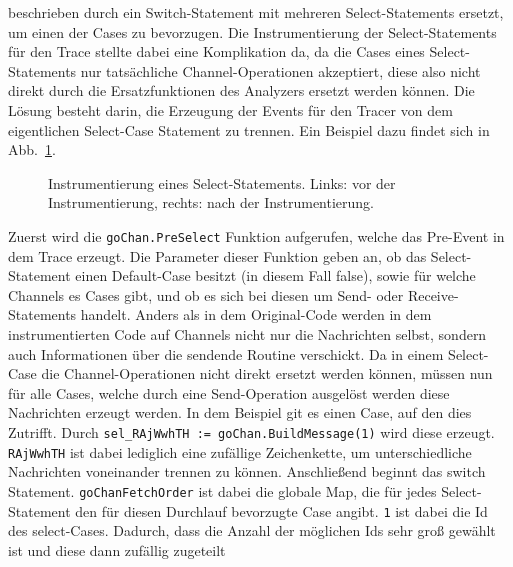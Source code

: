 beschrieben durch ein Switch-Statement mit mehreren Select-Statements 
ersetzt, um einen der Cases zu bevorzugen. 
Die Instrumentierung der Select-Statements für den Trace stellte dabei 
eine Komplikation da, da die Cases eines Select-Statements nur tatsächliche
Channel-Operationen akzeptiert, diese also nicht direkt durch die Ersatzfunktionen 
des Analyzers ersetzt werden können. Die Lösung besteht darin, die 
Erzeugung der Events für den Tracer von dem eigentlichen Select-Case Statement 
zu trennen. Ein Beispiel dazu findet sich in 
Abb.~\ref{Chap:Instrumenter-Sec:Instrumenter-Fig:SelectFull}.
\begin{figure}[h!]
  \begin{minipage}[t]{0.3\textwidth}
    
  \end{minipage}
  \begin{minipage}[t]{0.65\textwidth}
    
  \end{minipage}
  \caption{Instrumentierung eines Select-Statements. Links: vor der 
    Instrumentierung, rechts: nach der Instrumentierung.}
  \label{Chap:Instrumenter-Sec:Instrumenter-Fig:SelectFull}
\end{figure}
Zuerst wird die \texttt{goChan.PreSelect} Funktion aufgerufen, welche das 
Pre-Event in dem Trace erzeugt. Die Parameter dieser Funktion geben an, 
ob das Select-Statement einen Default-Case besitzt (in diesem Fall false),
sowie für welche Channels es Cases gibt, und ob es sich bei diesen 
um Send- oder Receive-Statements handelt. Anders als in dem Original-Code 
werden in dem instrumentierten Code auf Channels nicht nur die Nachrichten selbst, 
sondern auch Informationen über die sendende Routine verschickt. Da in einem 
Select-Case die Channel-Operationen nicht direkt ersetzt werden können, 
müssen nun für alle Cases, welche durch eine Send-Operation ausgelöst werden 
diese Nachrichten erzeugt werden. In dem Beispiel git es einen Case, 
auf den dies Zutrifft. Durch \texttt{sel\_RAjWwhTH := goChan.BuildMessage(1)}
wird diese erzeugt. \texttt{RAjWwhTH} ist dabei lediglich eine zufällige 
Zeichenkette, um unterschiedliche Nachrichten voneinander trennen zu können. 
Anschließend beginnt das switch Statement. \texttt{goChanFetchOrder} ist 
dabei die globale Map, die für jedes Select-Statement den für diesen 
Durchlauf bevorzugte Case angibt. \texttt{1} ist dabei die Id des 
select-Cases. Dadurch, dass die Anzahl 
der möglichen Ids sehr groß gewählt ist und diese dann zufällig zugeteilt 
